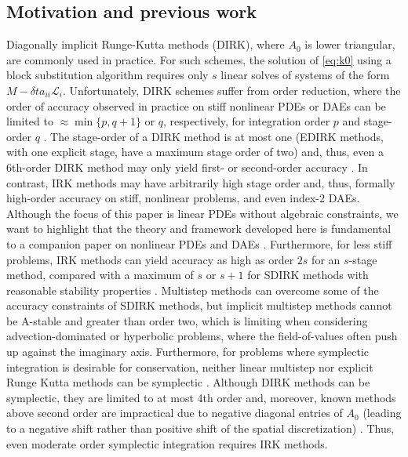 \documentclass[a4paper,10pt]{article}
\begin{document}
\subsection{Motivation and previous work}\label{sec:intro:hist}

Diagonally implicit Runge-Kutta methods (DIRK), where $A_0$ is lower triangular,
are commonly used in practice. For such schemes, the solution of \eqref{eq:k0}
using a block substitution algorithm requires only $s$ linear solves of systems
of the form $ M - \delta ta_{ii}\mathcal{L}_i$. Unfortunately, DIRK schemes
suffer from order reduction, where the order of accuracy observed in practice on
stiff nonlinear PDEs or DAEs can be limited to $\approx \min\{ p, q+1\}$ or $q$,
respectively, for integration order $p$ and stage-order $q$
\cite{hairer96,kennedy16}. The stage-order of a DIRK method is at most one
(EDIRK methods, with one explicit stage, have a maximum stage order of two) and,
thus, even a 6th-order DIRK method may only yield first- or second-order
accuracy \cite{butcher00}. In contrast, IRK methods may have arbitrarily high
stage order and, thus, formally high-order accuracy on stiff, nonlinear
problems, and even index-2 DAEs. Although the focus of this paper is linear PDEs
without algebraic constraints, we want to highlight that the theory and
framework developed here is fundamental to a companion paper on nonlinear PDEs
and DAEs \cite{irk2}. Furthermore, for less stiff problems, IRK methods can yield accuracy
as high as order $2s$ for an $s$-stage method, compared with a maximum of $s$ or
$s+1$ for SDIRK methods with reasonable stability properties \cite[Section
IV.6]{hairer96}. Multistep methods can overcome some of the accuracy
constraints of SDIRK methods, but implicit multistep methods cannot be
A-stable and greater than order two, which is limiting when considering
advection-dominated or hyperbolic problems, where the field-of-values often
push up against the imaginary axis. Furthermore, for problems where symplectic
integration is desirable for conservation, neither linear multistep nor explicit
Runge Kutta methods can be symplectic \cite{Hairer.2002}. Although DIRK methods
can be symplectic, they are limited to at most 4th order and, moreover, known
methods above second order are impractical due to negative diagonal entries
of $A_0$ (leading to a negative shift rather than positive shift of the spatial
discretization) \cite{kennedy16}. Thus, even moderate order symplectic
integration requires IRK methods.
\end{document}
